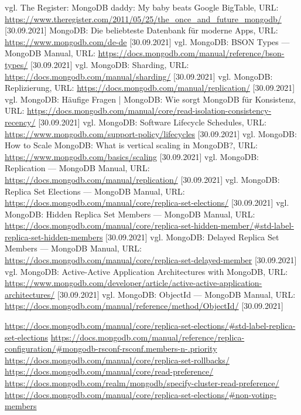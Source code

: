 \begin{thebibliography}{2}
         vgl. The Register: MongoDB daddy: My baby beats Google BigTable, URL: \url{https://www.theregister.com/2011/05/25/the_once_and_future_mongodb/} [30.09.2021]
         MongoDB: Die beliebteste Datenbank für moderne Apps, URL: \url{https://www.mongodb.com/de-de} [30.09.2021]
         vgl. MongoDB: BSON Types — MongoDB Manual, URL: \url{https://docs.mongodb.com/manual/reference/bson-types/} [30.09.2021]
         vgl. MongoDB: Sharding, URL: \url{https://docs.mongodb.com/manual/sharding/} [30.09.2021]
         vgl. MongoDB: Replizierung, URL: \url{https://docs.mongodb.com/manual/replication/} [30.09.2021]
         vgl. MongoDB: Häufige Fragen | MongoDB: Wie sorgt MongoDB für Konsistenz, URL: \url{https://docs.mongodb.com/manual/core/read-isolation-consistency-recency/} [30.09.2021]
         vgl. MongoDB: Software Lifecycle Schedules, URL: \url{https://www.mongodb.com/support-policy/lifecycles} [30.09.2021]
         vgl. MongoDB: How to Scale MongoDB: What is vertical scaling in MongoDB?, URL: \url{https://www.mongodb.com/basics/scaling} [30.09.2021]
         vgl. MongoDB: Replication — MongoDB Manual, URL: \url{https://docs.mongodb.com/manual/replication/} [30.09.2021]
         vgl. MongoDB: Replica Set Elections — MongoDB Manual, URL: \url{https://docs.mongodb.com/manual/core/replica-set-elections/} [30.09.2021]
         vgl. MongoDB: Hidden Replica Set Members — MongoDB Manual, URL: \url{https://docs.mongodb.com/manual/core/replica-set-hidden-member/#std-label-replica-set-hidden-members} [30.09.2021]
         vgl. MongoDB: Delayed Replica Set Members — MongoDB Manual, URL: \url{https://docs.mongodb.com/manual/core/replica-set-delayed-member} [30.09.2021]
         vgl. MongoDB: Active-Active Application Architectures with MongoDB, URL: \url{https://www.mongodb.com/developer/article/active-active-application-architectures/} [30.09.2021]
         vgl. MongoDB: ObjectId — MongoDB Manual, URL: \url{https://docs.mongodb.com/manual/reference/method/ObjectId/} [30.09.2021]

         \url{https://docs.mongodb.com/manual/core/replica-set-elections/#std-label-replica-set-elections}
         \url{https://docs.mongodb.com/manual/reference/replica-configuration/#mongodb-rsconf-rsconf.members-n-.priority}
         \url{https://docs.mongodb.com/manual/core/replica-set-rollbacks/}
         \url{https://docs.mongodb.com/manual/core/read-preference/}
         \url{https://docs.mongodb.com/realm/mongodb/specify-cluster-read-preference/}
         \url{https://docs.mongodb.com/manual/core/replica-set-elections/#non-voting-members}


\end{thebibliography}
